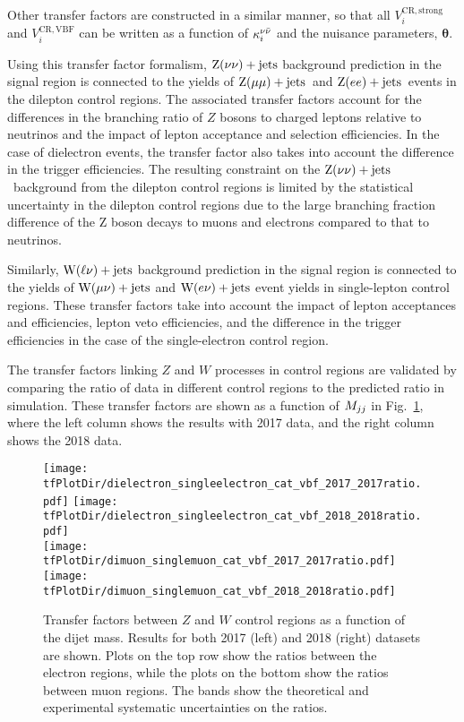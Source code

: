 Other transfer factors are constructed in a similar manner, so that all $V_{i}^{\mathrm{CR,strong}}$ and
$V_{i}^{\mathrm{CR,VBF}}$ can be written as a function of $\kappa_{i}^{\nu\bar{\nu}}$ and the nuisance parameters, $\boldsymbol{\theta}$. 

Using this transfer factor formalism, $\mathrm{Z}(\nu\nu)+\textrm{jets}$ background prediction in the signal region is connected 
to the yields of $\mathrm{Z}(\mu\mu)+\textrm{jets}$~and $\mathrm{Z}(ee)+\textrm{jets}$~events
in the dilepton control regions. The associated transfer factors account for the differences in the
branching ratio of $Z$ bosons to charged leptons relative to neutrinos and the impact of lepton acceptance and selection
efficiencies. In the case of dielectron events, the transfer factor also takes into account the
difference in the trigger efficiencies. The resulting constraint on the $\mathrm{Z}(\nu\nu)+\textrm{jets}$~background from the dilepton
control regions is limited by the statistical uncertainty in the dilepton control regions due to the large
branching fraction difference of the Z boson decays to muons and electrons compared to that to neutrinos.

Similarly, $\mathrm{W}(\ell\nu)+\textrm{jets}$ background prediction in the signal region is connected to the yields of
$\mathrm{W}(\mu\nu)+\textrm{jets}$ and $\mathrm{W}(e\nu)+\textrm{jets}$ event yields in single-lepton control regions.
These transfer factors take into account
the impact of lepton acceptances and efficiencies, lepton veto efficiencies, and
the difference in the trigger efficiencies in the case of the single-electron control region.

The transfer factors linking $Z$ and $W$ processes in control regions are validated by comparing the ratio of data in
different control regions to the predicted ratio in simulation. These transfer factors are shown as a function of $M_{jj}$
in Fig.~\ref{fig:transfer_factors_zoverw}, where the left column shows the results with 2017 data, and the right column
shows the 2018 data. 

\begin{figure}[htbp]
  \centering
    \texttt{[image: \\tfPlotDir/dielectron\_singleelectron\_cat\_vbf\_2017\_2017ratio.pdf]}
    \texttt{[image: \\tfPlotDir/dielectron\_singleelectron\_cat\_vbf\_2018\_2018ratio.pdf]} \\
    \texttt{[image: \\tfPlotDir/dimuon\_singlemuon\_cat\_vbf\_2017\_2017ratio.pdf]}
    \texttt{[image: \\tfPlotDir/dimuon\_singlemuon\_cat\_vbf\_2018\_2018ratio.pdf]}
  \caption{Transfer factors between $Z$ and $W$ control regions as a function of the dijet 
    mass. Results for both 2017 (left) and 2018 (right) datasets are shown. Plots on the top row show the ratios
    between the electron regions, while the plots on the bottom show the ratios between muon regions. 
    The bands show the theoretical and experimental systematic uncertainties on the ratios.}
    \label{fig:transfer_factors_zoverw}
\end{figure}


